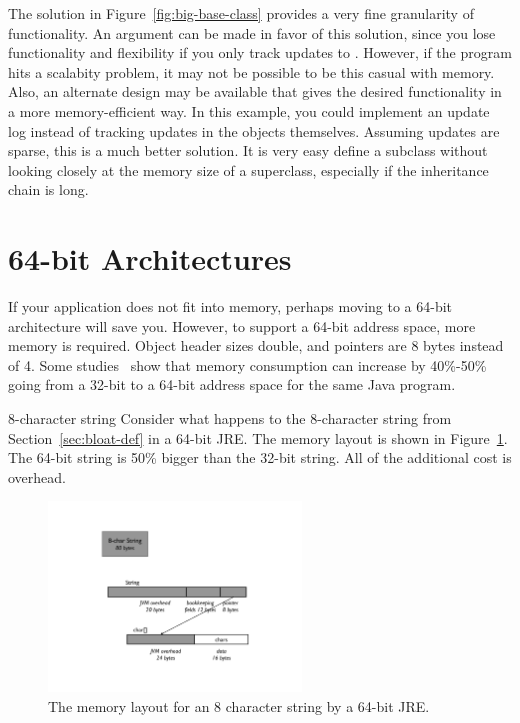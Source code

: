 The solution in Figure~\ref{fig:big-base-class} provides a very fine
granularity of functionality. An argument can be made in favor of this
solution, since you lose functionality and flexibility if you only track
updates to . However, if the program hits a scalabity
problem, it may not be possible to be this casual with memory. Also, an alternate design may be available that gives the desired functionality in a more memory-efficient way. In this example, you could implement an update log instead of tracking updates in the objects themselves. Assuming updates are sparse, this is a much better solution. It is very easy define a subclass without looking closely at the memory size of a superclass, especially if the inheritance chain is long.

\section{64-bit Architectures}

If your application does not fit into memory, perhaps moving to a 64-bit architecture will save you. However, to support a 64-bit address space, more memory is required. Object header sizes double, and pointers are 8 bytes instead of 4. Some studies~\cite{compressedAddress} show that memory consumption can increase by 40\%-50\% going from a 32-bit to a 64-bit address space for the same Java program.
\begin{example}{8-character string} 
Consider what happens to the 8-character string from Section~\ref{sec:bloat-def} in a 64-bit JRE. The memory layout is shown in Figure~\ref{fig:8-char-string-64-bit}. The 64-bit string is 50\% bigger than the 32-bit string. All of the additional cost is overhead.
\end{example} 
 \begin{figure}
  \centering
 \includegraphics[width=0.6\textwidth]{Figures/chapter4/8-char-string-64-bit.pdf}
  \caption{The memory layout for an 8 character string by a 64-bit JRE.}
  \label{fig:8-char-string-64-bit}
\end{figure}

